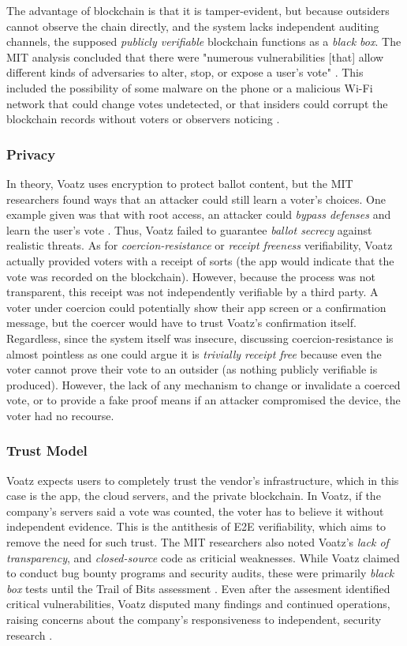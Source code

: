 The advantage of blockchain is that it is tamper-evident, but because outsiders cannot observe the chain directly, and the system lacks independent auditing channels, the supposed \emph{publicly verifiable} blockchain functions as a \emph{black box}. 
The MIT analysis concluded that there were "numerous vulnerabilities [that] allow different kinds of adversaries to alter, stop, or expose a user's vote" \cite{specter2020ballot}. 
This included the possibility of some malware on the phone or a malicious Wi-Fi network that could change votes undetected, or that insiders could corrupt the blockchain records without voters or observers noticing \cite{govtech-voatz-audit-2020}.

\subsubsection{Privacy}
In theory, Voatz uses encryption to protect ballot content, but the MIT researchers found ways that an attacker could still learn a voter's choices. 
One example given was that with root access, an attacker could \emph{bypass defenses} and learn the user's vote \cite{statescoop-voatz-audit-2020}. 
Thus, Voatz failed to guarantee \emph{ballot secrecy} against realistic threats. 
As for \emph{coercion-resistance} or \emph{receipt freeness} verifiability, Voatz actually provided voters with a receipt of sorts (the app would indicate that the vote was recorded on the blockchain). 
However, because the process was not transparent, this receipt was not independently verifiable by a third party.
A voter under coercion could potentially show their app screen or a confirmation message, but the coercer would have to trust Voatz's confirmation itself. 
Regardless, since the system itself was insecure, discussing coercion-resistance is almost pointless as one could argue it is \emph{trivially receipt free} because even the voter cannot prove their vote to an outsider (as nothing publicly verifiable is produced). 
However, the lack of any mechanism to change or invalidate a coerced vote, or to provide a fake proof means if an attacker compromised the device, the voter had no recourse. 

\subsubsection{Trust Model}
Voatz expects users to completely trust the vendor's infrastructure, which in this case is the app, the cloud servers, and the private blockchain.
In Voatz, if the company's servers said a vote was counted, the voter has to believe it without independent evidence. 
This is the antithesis of E2E verifiability, which aims to remove the need for such trust. 
The MIT researchers also noted Voatz's \emph{lack of transparency}, and \emph{closed-source} code as criticial weaknesses.
While Voatz claimed to conduct bug bounty programs and security audits, these were primarily \emph{black box} tests until the Trail of Bits assessment \cite{voatz-audits}.
Even after the assesment identified critical vulnerabilities, Voatz disputed many findings and continued operations, raising concerns about the company's responsiveness to independent, security research \cite{techtarget-voatz-mit-2020}.



